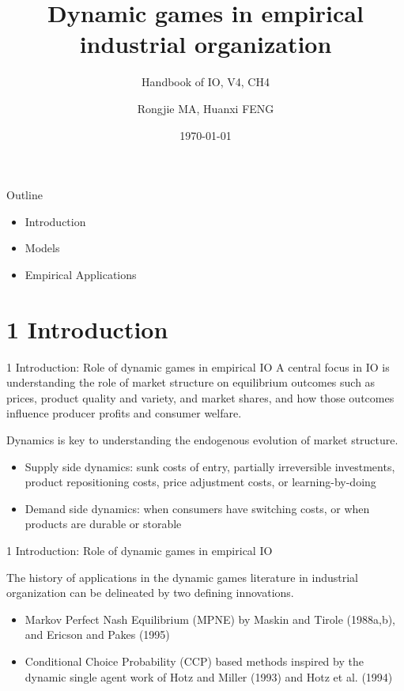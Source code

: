 \documentclass[aspectratio=169]{beamer}  %
\title{Dynamic games in empirical industrial organization}
\subtitle{Handbook of IO, V4, CH4}
\author{Rongjie MA, Huanxi FENG}
\institute{Hong Kong University of Science and Technology}
\date{\today}
\begin{document}
\begin{frame}
    \titlepage
\end{frame}


\begin{frame}{Outline}
    \begin{itemize}
        \item Introduction
        \item Models
        \item Empirical Applications
    \end{itemize}
\end{frame}



\section{1 Introduction}
\begin{frame}
{1 Introduction: Role of dynamic games in empirical IO}
A central focus in IO is understanding the role of market structure on equilibrium outcomes such as prices, product quality and variety, and market shares, and how those outcomes influence producer profits and consumer welfare.

Dynamics is key to understanding the endogenous evolution of market structure.
\begin{itemize}
    \item Supply side dynamics: sunk costs of entry, partially irreversible investments, product repositioning costs, price adjustment costs, or learning-by-doing
    \item Demand side dynamics: when consumers have switching costs, or when products are durable or storable
\end{itemize}
\end{frame}


\begin{frame}
{1 Introduction: Role of dynamic games in empirical IO}

The history of applications in the dynamic games literature in industrial organization can be delineated by two defining innovations.
    \begin{itemize}
        \item Markov Perfect Nash Equilibrium (MPNE) by Maskin and Tirole (1988a,b), and Ericson and Pakes (1995)
        \item Conditional Choice Probability (CCP) based methods inspired by the dynamic single agent work of Hotz and Miller (1993) and Hotz et al. (1994)
    \end{itemize}
\end{frame}
\end{document}
